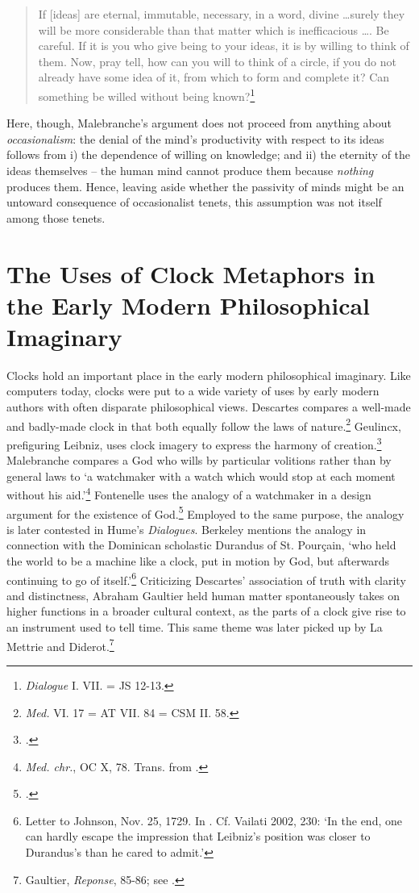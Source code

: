 \documentclass{article}
\begin{document}
\begin{quote}
If [ideas] are eternal, immutable, necessary, in a word, divine \ldots surely they will be more considerable than that matter which is inefficacious \ldots. Be careful. If it is you who give being to your ideas, it is by willing to think of them. Now, pray tell, how can you will to think of a circle, if you do not already have some idea of it, from which to form and complete it? Can something be willed without being known?\footnote{\emph{Dialogue} I. VII. = JS 12-13.}
\end{quote}

Here, though, Malebranche's argument does not proceed from anything
about \emph{occasionalism}: the denial of the mind's productivity with
respect to its ideas follows from i) the dependence of willing on
knowledge; and ii) the eternity of the ideas themselves -- the human
mind cannot produce them because \emph{nothing} produces them. Hence,
leaving aside whether the passivity of minds might be an untoward
consequence of occasionalist tenets, this assumption was not itself
among those tenets.

\section{The Uses of Clock Metaphors in the Early Modern Philosophical
Imaginary}

Clocks hold an important place in the early modern philosophical
imaginary. Like computers today, clocks were put to a wide variety of
uses by early modern authors with often disparate philosophical views.
Descartes compares a well-made and badly-made clock in that both equally
follow the laws of nature.\footnote{\emph{Med.} VI. 17 = AT VII. 84 =
  CSM II. 58.} Geulincx, prefiguring Leibniz, uses clock imagery to
express the harmony of creation.\footnote{\autocite[168]{Cooney1978}.} Malebranche
compares a God who wills by particular volitions rather than by general
laws to `a watchmaker with a watch which would stop at each moment
without his aid.'\footnote{\emph{Med. chr.}, OC X, 78. Trans. from \autocite[235]{Wahl2011}.} Fontenelle uses the analogy of a watchmaker in a design
argument for the existence of God.\footnote{\autocite[618]{Durant1963}.}
Employed to the same purpose, the analogy is later contested in Hume's
\emph{Dialogues}. Berkeley mentions the analogy in connection with the
Dominican scholastic Durandus of St. Pourçain, `who held the world to be
a machine like a clock, put in motion by God, but afterwards continuing
to go of itself.'\footnote{Letter to Johnson, Nov. 25, 1729. In \autocite[291]{Winkler2011}. Cf. Vailati 2002, 230: `In the end, one can hardly escape
  the impression that Leibniz's position was closer to Durandus's than
  he cared to admit.'} Criticizing Descartes' association of truth with
clarity and distinctness, Abraham Gaultier held human matter
spontaneously takes on higher functions in a broader cultural context,
as the parts of a clock give rise to an instrument used to tell time.
This same theme was later picked up by La Mettrie and Diderot.\footnote{Gaultier,
  \emph{Reponse}, 85-86; see \autocite{Kaitaro2016}.}
\end{document}

